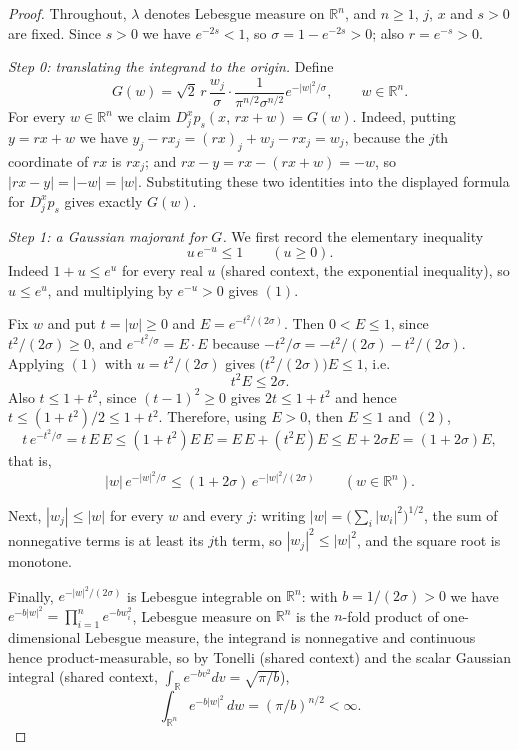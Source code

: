 \begin{proof}
Throughout, $\lambda$ denotes Lebesgue measure on $\mathbb{R}^n$, and $n \geq 1$,
$j$, $x$ and $s > 0$ are fixed.  Since $s > 0$ we have $e^{-2s} < 1$, so
$\sigma = 1 - e^{-2s} > 0$; also $r = e^{-s} > 0$.

\emph{Step 0: translating the integrand to the origin.}
Define
\[
  G(w) = \sqrt2\,r\,\frac{w_j}{\sigma}\cdot
      \frac{1}{\pi^{n/2}\sigma^{n/2}}e^{-|w|^2/\sigma} ,
  \qquad w \in \mathbb{R}^n .
\]
For every $w \in \mathbb{R}^n$ we claim $D_j^xp_s(x,\,rx+w) = G(w)$.  Indeed,
putting $y = rx+w$ we have $y_j - rx_j = (rx)_j + w_j - rx_j = w_j$, because the
$j$th coordinate of $rx$ is $rx_j$; and $rx - y = rx - (rx+w) = -w$, so
$|rx-y| = |-w| = |w|$.  Substituting these two identities into the displayed
formula for $D_j^xp_s$ gives exactly $G(w)$.

\emph{Step 1: a Gaussian majorant for $G$.}
We first record the elementary inequality
\begin{equation*}
  u\,e^{-u} \leq 1 \qquad (u \geq 0) . \tag{1}
\end{equation*}
Indeed $1+u \leq e^u$ for every real $u$ (shared context, the exponential
inequality), so $u \leq e^u$, and multiplying by $e^{-u} > 0$ gives $(1)$.

Fix $w$ and put $t = |w| \geq 0$ and $E = e^{-t^2/(2\sigma)}$.  Then
$0 < E \leq 1$, since $t^2/(2\sigma) \geq 0$, and
$e^{-t^2/\sigma} = E\cdot E$ because
$-t^2/\sigma = -t^2/(2\sigma) - t^2/(2\sigma)$.  Applying $(1)$ with
$u = t^2/(2\sigma)$ gives $\bigl(t^2/(2\sigma)\bigr)E \leq 1$, i.e.
\begin{equation*}
  t^2E \leq 2\sigma . \tag{2}
\end{equation*}
Also $t \leq 1+t^2$, since $(t-1)^2 \geq 0$ gives $2t \leq 1+t^2$ and hence
$t \leq (1+t^2)/2 \leq 1+t^2$.  Therefore, using $E > 0$, then $E \leq 1$ and
$(2)$,
\[
  t\,e^{-t^2/\sigma} = t\,E\,E \leq (1+t^2)E\,E = E\,E + (t^2E)E
    \leq E + 2\sigma E = (1+2\sigma)E ,
\]
that is,
\begin{equation*}
  |w|\,e^{-|w|^2/\sigma} \leq (1+2\sigma)\,e^{-|w|^2/(2\sigma)}
  \qquad (w \in \mathbb{R}^n) . \tag{3}
\end{equation*}

Next, $|w_j| \leq |w|$ for every $w$ and every $j$: writing
$|w| = \bigl(\sum_i |w_i|^2\bigr)^{1/2}$, the sum of nonnegative terms is at
least its $j$th term, so $|w_j|^2 \leq |w|^2$, and the square root is monotone.

Finally, $e^{-|w|^2/(2\sigma)}$ is Lebesgue integrable on $\mathbb{R}^n$: with
$b = 1/(2\sigma) > 0$ we have
$e^{-b|w|^2} = \prod_{i=1}^n e^{-bw_i^2}$, Lebesgue measure on $\mathbb{R}^n$ is
the $n$-fold product of one-dimensional Lebesgue measure, the integrand is
nonnegative and continuous hence product-measurable, so by Tonelli (shared
context) and the scalar Gaussian integral (shared context, $\int_{\mathbb{R}}
e^{-bv^2}dv = \sqrt{\pi/b}$),
\begin{equation*}
  \int_{\mathbb{R}^n} e^{-b|w|^2}\,dw = (\pi/b)^{n/2} < \infty . \tag{4}
\end{equation*}


\end{proof}
